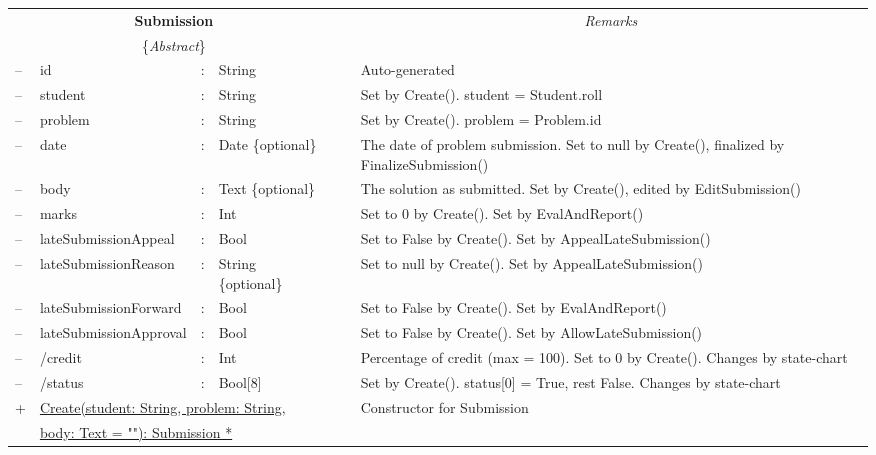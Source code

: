 \documentclass{article}
\begin{document}
\begin{enumerate}
\begin{center}
\begin{scriptsize}
\begin{tabular}{|lllll|l|p{7cm}|} \cline{1-5} \cline{7-7}
\multicolumn{5}{|c|}{\bf \textsf{Submission}} 			& & \multicolumn{1}{|c|}{\em Remarks}\\
\multicolumn{5}{|c|}{\{{\em Abstract}\} } 	& & \multicolumn{1}{|c|}{\em }\\ \cline{1-5} \cline{7-7}
-- & \textsf{id} 		& : & String 	& & & Auto-generated\\
-- & \textsf{student}	& : & String 	& & & Set by Create(). \textsf{student} = \textsf{Student.roll} \\
-- & \textsf{problem}	& : & String 	& & & Set by Create(). \textsf{problem} = \textsf{Problem.id} \\
-- & \textsf{date} 		& : & Date \{optional\} 		& & & The date of problem submission. Set to null by Create(), finalized by FinalizeSubmission()  \\
-- & \textsf{body} 		& : & Text \{optional\} 	& & & The solution as submitted. Set by Create(), edited by EditSubmission() \\
-- & \textsf{marks} 	& : & Int			 		& & & Set to 0 by Create(). Set by EvalAndReport() \\
-- & \textsf{lateSubmissionAppeal} & : & Bool 		& & & Set to False by Create(). Set by AppealLateSubmission() \\
-- & \textsf{lateSubmissionReason}	& : & String \{optional\} 	& & & Set to null by Create(). Set by AppealLateSubmission() \\
-- & \textsf{lateSubmissionForward} & : & Bool 		& & & Set to False by Create(). Set by EvalAndReport() \\
-- & \textsf{lateSubmissionApproval} & : & Bool 		& & & Set to False by Create(). Set by AllowLateSubmission() \\
-- & /\textsf{credit} 	& : & Int 	& & & Percentage of credit (max = 100). Set to 0 by Create(). Changes by state-chart \\
-- & /\textsf{status} 	& : & Bool[8] 	& & & Set by Create(). \textsf{status[0]} = True, rest False. Changes by state-chart \\
\cline{1-5} \cline{7-7}
 + & \multicolumn{4}{l|}{\underline{Create(student: String, problem: String, }} & & Constructor for Submission \\ 
   & \multicolumn{4}{l|}{\quad \quad \underline{body: Text = ""): Submission *}} & &  \\

\end{tabular}
\end{scriptsize}
\end{center}
\end{enumerate}
\end{document}
